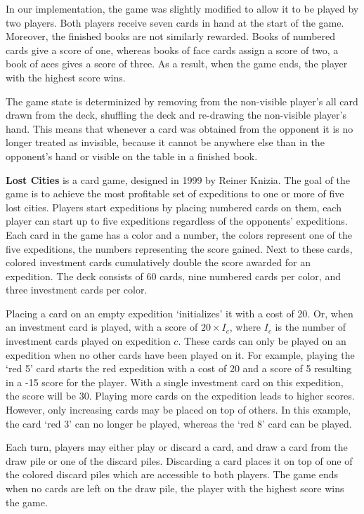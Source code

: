 \documentclass[a4paper]{llncs}
\begin{document}
In our implementation, the game was slightly modified to allow it to be played by two players. Both players receive seven cards in hand at the start of the game. Moreover, the finished books are not similarly rewarded. Books of numbered cards give a score of one, whereas books of face cards assign a score of two, a book of aces gives a score of three. As a result, when the game ends, the player with the highest score wins.

The game state is determinized by removing from the non-visible player's all card drawn from the deck, shuffling the deck and re-drawing the non-visible player's hand. This means that whenever a card was obtained from the opponent it is no longer treated as invisible, because it cannot be anywhere else than in the opponent's hand or visible on the table in a finished book.

{\sc \bf Lost Cities} is a card game, designed in 1999 by Reiner Knizia. The goal of the game is to achieve the most profitable set of expeditions to one or more of five lost cities. Players start expeditions by placing numbered cards on them, each player can start up to five expeditions regardless of the opponents' expeditions. Each card in the game has a color and a number, the colors represent one of the five expeditions, the numbers representing the score gained. Next to these cards, colored investment cards cumulatively double the score awarded for an expedition. The deck consists of 60 cards, nine numbered cards per color, and three investment cards per color.

Placing a card on an empty expedition `initializes' it with a cost of 20. Or, when an investment card is played, with a score of $20\times I_c$, where $I_c$ is the number of investment cards played on expedition $c$. These cards can only be played on an expedition when no other cards have been played on it. For example, playing the `red 5' card starts the red expedition with a cost of 20 and a score of 5 resulting in a -15 score for the player. With a single investment card on this expedition, the score will be 30. Playing more cards on the expedition leads to higher scores. However, only increasing cards may be placed on top of others. In this example, the card `red 3' can no longer be played, whereas the `red 8' card can be played.

Each turn, players may either play or discard a card, and draw a card from the draw pile or one of the discard piles. Discarding a card places it on top of one of the colored discard piles which are accessible to both players. The game ends when no cards are left on the draw pile, the player with the highest score wins the game.
\end{document}
